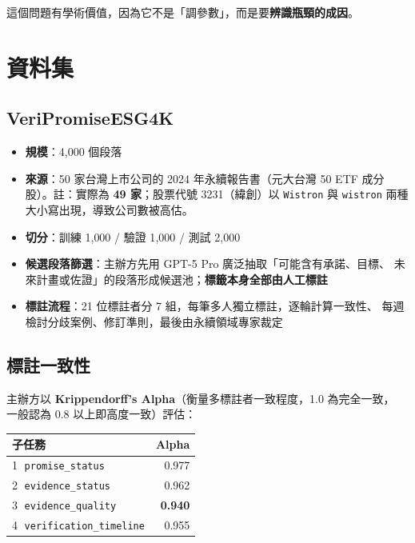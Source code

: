 \documentclass[11pt,a4paper]{ctexart}
\newcommand{\fieldname}[1]{\texttt{#1}}
\begin{document}
這個問題有學術價值，因為它不是「調參數」，而是要\textbf{辨識瓶頸的成因}。

\section{資料集}

\subsection{VeriPromiseESG4K}

\begin{itemize}[leftmargin=2em, itemsep=2pt]
  \item \textbf{規模}：4{,}000 個段落
  \item \textbf{來源}：50 家台灣上市公司的 2024 年永續報告書（元大台灣 50 ETF
        成分股）。註：實際為 \textbf{49 家}；股票代號 3231（緯創）以
        \texttt{Wistron} 與 \texttt{wistron} 兩種大小寫出現，導致公司數被高估。
  \item \textbf{切分}：訓練 1{,}000 / 驗證 1{,}000 / 測試 2{,}000
  \item \textbf{候選段落篩選}：主辦方先用 GPT-5 Pro 廣泛抽取「可能含有承諾、目標、
        未來計畫或佐證」的段落形成候選池；\textbf{標籤本身全部由人工標註}
  \item \textbf{標註流程}：21 位標註者分 7 組，每筆多人獨立標註，逐輪計算一致性、
        每週檢討分歧案例、修訂準則，最後由永續領域專家裁定
\end{itemize}

\subsection{標註一致性}

主辦方以 \textbf{Krippendorff's Alpha}（衡量多標註者一致程度，1.0 為完全一致，
一般認為 0.8 以上即高度一致）評估：

\begin{table}[h]
\centering
\small
\begin{tabular}{@{}lr@{}}
\toprule
子任務 & Alpha \\
\midrule
\textcircled{1} \fieldname{promise\_status}        & 0.977 \\
\textcircled{2} \fieldname{evidence\_status}       & 0.962 \\
\textcircled{3} \fieldname{evidence\_quality}      & \textbf{0.940} \\
\textcircled{4} \fieldname{verification\_timeline} & 0.955 \\
\bottomrule
\end{tabular}
\end{table}
\end{document}
